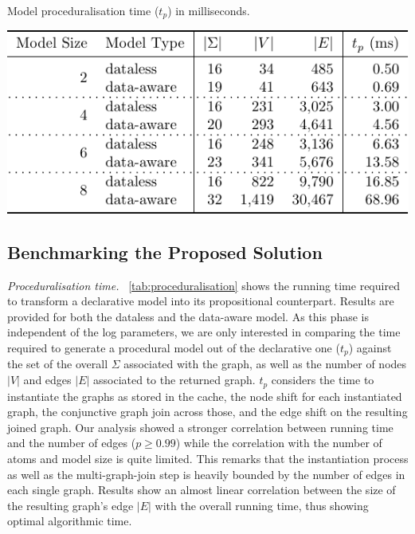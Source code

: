 \documentclass[sigconf]{acmart}
\begin{document}
\begin{table}[!t]
\centering
\caption{Model proceduralisation time ($t_p$) in milliseconds.}\label{tab:proceduralisation}
\includegraphics[scale=.7]{fig/tabmod}
\end{table}
\subsection{Benchmarking the Proposed Solution}\label{ssec:proposed}


\textit{Proceduralisation time.} \tablename~\ref{tab:proceduralisation} shows the running time required to transform a declarative model into its propositional counterpart. Results are provided for both the dataless and the data-aware model. As this phase is independent of the log parameters, we are only interested in comparing the time required to generate a procedural model out of the declarative one ($t_p$) against the set of the overall $\Sigma$ associated with the graph, as well as the number of nodes $|V|$ and edges $|E|$ associated to the returned graph. $t_p$ considers the time to instantiate the graphs as stored in the cache,  the node shift for each instantiated graph,  the conjunctive graph join across those, and the edge shift on the resulting joined graph. Our analysis showed a stronger correlation between running time and the number of edges ($p\geq 0.99$) while the correlation with the number of atoms and model size is quite limited. This remarks that the instantiation process as well as the multi-graph-join step is heavily bounded by the number of edges in each single graph. Results show an almost linear correlation between the size of the resulting graph's edge $|E|$ with the overall running time, thus showing optimal algorithmic time.\medskip
\end{document}
